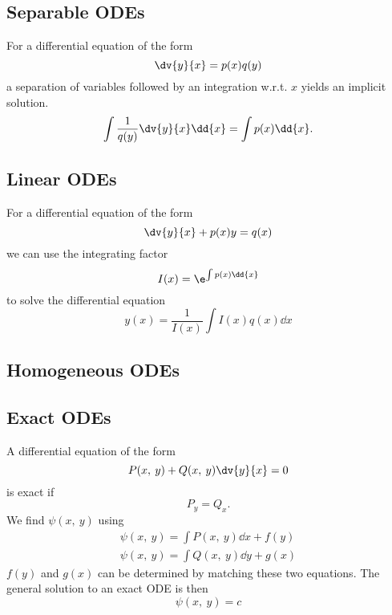 \documentclass{article}
\begin{document}
\subsection{Separable ODEs}
For a differential equation of the form
\begin{equation*}
    \dv{y}{x} = p(x) q(y)
\end{equation*}
a separation of variables followed by an integration w.r.t. $x$ yields an implicit solution.
\begin{equation*}
    \int \frac{1}{q(y)} \dv{y}{x} \dd{x} = \int p(x) \dd{x}.
\end{equation*}
\subsection{Linear ODEs}
For a differential equation of the form
\begin{equation*}
    \dv{y}{x} + p(x)y = q(x)
\end{equation*}
we can use the integrating factor
\begin{equation*}
    I(x) = \e^{\int p(x) \dd{x}}
\end{equation*}
to solve the differential equation
\begin{equation*}
    y(x) = \frac{1}{I(x)} \int I(x) q(x) \dd{x}
\end{equation*}
\subsection{Homogeneous ODEs}
\subsection{Exact ODEs}
A differential equation of the form
\begin{equation*}
    P(x,\: y) + Q(x,\: y)\dv{y}{x} = 0
\end{equation*}
is exact if 
\begin{equation*}
    P_y = Q_x.
\end{equation*}
We find $\psi(x,\: y)$ using
\begin{gather*}
    \psi(x,\: y) = \int P(x,\: y) \dd{x} + f(y) \\
    \psi(x,\: y) = \int Q(x,\: y) \dd{y} + g(x) 
\end{gather*}
$f(y)$ and $g(x)$ can be determined by matching these two equations.
The general solution to an exact ODE is then
\begin{equation*}
    \psi(x,\: y) = c
\end{equation*}
\end{document}
